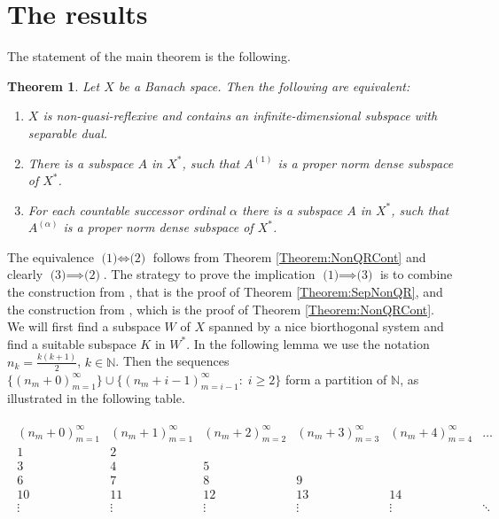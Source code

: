 \documentclass{amsart}
\newtheorem{theorem}{Theorem}[section]
\theoremstyle{definition}
\begin{document}
\section{The results}

The statement of the main theorem is the following.

\begin{theorem} \label{Theorem:Main}
    Let $X$ be a Banach space. Then the following are equivalent:
    \begin{enumerate}
        \item $X$ is non-quasi-reflexive and contains an infinite-dimensional subspace with separable dual.
        \item There is a subspace $A$ in $X^*$, such that $A^{(1)}$ is a proper norm dense subspace of $X^*$.
        \item For each countable successor ordinal $\alpha$ there is a subspace $A$ in $X^*$, such that $A^{(\alpha)}$ is a proper norm dense subspace of $X^*$.
    \end{enumerate}
\end{theorem}

The equivalence $\textit{(1)} \iff \textit{(2)}$ follows from Theorem \ref{Theorem:NonQRCont} and clearly $\textit{(3)} \implies \textit{(2)}$. The strategy to prove the implication $\textit{(1)} \implies \textit{(3)}$ is to combine the construction from \cite{Ostrovskii1987}, that is the proof of Theorem \ref{Theorem:SepNonQR}, and the construction from \cite{Ostrovskii2011}, which is the proof of Theorem \ref{Theorem:NonQRCont}. We will first find a subspace $W$ of $X$ spanned by a nice biorthogonal system and find a suitable subspace $K$ in $W^*$. In the following lemma we use the notation $n_k = \frac{k(k+1)}{2}$, $k \in \mathbb{N}$. Then the sequences $\{(n_m + 0)_{m=1}^\infty\} \cup \{(n_m + i - 1)_{m=i-1}^\infty: \; i \geq 2\}$ form a partition of $\mathbb{N}$, as illustrated in the following table.

\begin{align*}
    \begin{array}{cccccc}
        (n_m + 0)_{m=1}^\infty & (n_m + 1)_{m=1}^\infty & (n_m + 2)_{m=2}^\infty & (n_m + 3)_{m=3}^\infty & (n_m + 4)_{m=4}^\infty & \dots \\
        1&2&&&& \\
        3&4&5&&& \\
        6&7&8&9&& \\
        10&11&12&13&14& \\
        \vdots&\vdots&\vdots&\vdots&\vdots&\ddots
    \end{array}
\end{align*}
\end{document}
